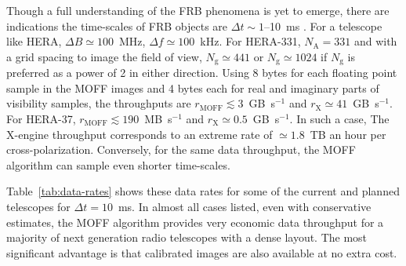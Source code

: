 \documentclass[a4paper,fleqn,usenatbib]{mnras}
\newcommand{\Nant}{N_\textrm{A}}
\newcommand{\Ngrid}{N_\textrm{g}}
\begin{document}
Though a full understanding of the FRB phenomena is yet to emerge, there are indications the time-scales of FRB objects are $\Delta t \sim 1$--10~ms \citep{tho13}. For a telescope like HERA, $\Delta B \simeq 100$~MHz, $\Delta f \simeq 100$~kHz. For HERA-331, $\Nant=331$ and with a grid spacing to image the field of view, $\Ngrid \simeq 441$ or $\Ngrid \simeq 1024$ if $\Ngrid$ is preferred as a power of 2 in either direction. Using 8 bytes for each floating point sample in the MOFF images and 4 bytes each for real and imaginary parts of visibility samples, the throughputs are $r_\textrm{MOFF} \lesssim 3$~GB~s$^{-1}$ and $r_\textrm{X} \simeq 41$~GB~s$^{-1}$. For HERA-37, $r_\textrm{MOFF} \lesssim 190$~MB~s$^{-1}$ and $r_\textrm{X} \simeq 0.5$~GB~s$^{-1}$. In such a case, The X-engine throughput corresponds to an extreme rate of $\simeq 1.8$~TB an hour per cross-polarization. Conversely, for the same data throughput, the MOFF algorithm can sample even shorter time-scales. 

Table~\ref{tab:data-rates} shows these data rates for some of the current and planned telescopes for $\Delta t=10$~ms. In almost all cases listed, even with conservative estimates, the MOFF algorithm provides very economic data throughput for a majority of next generation radio telescopes with a dense layout. The most significant advantage is that calibrated images are also available at no extra cost.
\end{document}
